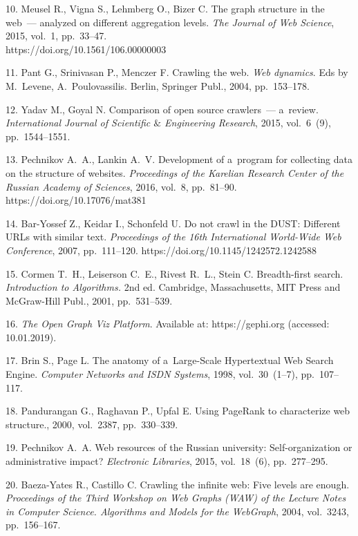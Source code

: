 {10. Meusel R., Vigna S., Lehmberg O., Bizer C. The graph structure
in the web~--- analy\-zed on different aggregation levels.
\emph{The Journal of Web Science}, 2015, vol.~1, pp.~33--47.\\
https://doi.org/10.1561/106.00000003

11. Pant G., Srinivasan P., Menczer F. Crawling the web. {\it Web
dynamics}. Eds by M.~Levene, A.~Poulovassilis. Berlin, Springer
Publ., 2004, pp.~153--178.

12. Yadav M., Goyal N. Comparison of open source crawlers~---
a~review. \emph{International Journal of Scientific $\&$
Engineering Research}, 2015, vol.~6~(9), pp.~1544--1551.

13. Pechnikov A.~A., Lankin A.~V. Development of a~program for
collecting data on the structure of websites. \emph{Proceedings of
the Karelian Research Center of the Russian Academy of Sciences},
2016, vol.~8, pp.~81--90. https://doi.org/10.17076/mat381

14. Bar-Yossef Z., Keidar I., Schonfeld U. Do not crawl in the
DUST: Different URLs with similar text. \emph{Proceedings of the
16th International World-Wide Web Conference}, 2007, pp.~111--120.
https://doi.org/10.1145/1242572.1242588

15. Cormen T.~H., Leiserson C.~E., Rivest R.~L., Stein C.
Breadth-first search. \emph{Introduc\-tion to Algorithms.} 2nd ed.
Cambridge, Massachusetts, MIT Press and McGraw-Hill Publ., 2001,
pp.~531--539.

16. {\it The Open Graph Viz Platform}. Available at:
https://gephi.org (accessed: 10.01.2019).

17. Brin S., Page L. The anatomy of a~Large-Scale Hypertextual Web
Search Engine. \emph{Computer Networks and ISDN Systems}, 1998,
vol.~30~(1--7), pp.~107--117.

18. Pandurangan G., Raghavan P., Upfal E. Using PageRank to
characterize web structure.\linebreak\newpage{}, 2000, vol.~2387, pp.~330--339.

19. Pechnikov A.~A. Web resources of the Russian university:
Self-organization or admini\-strative impact?
\emph{Electronic Libraries}, 2015, vol.~18~(6), pp.~277--295.

20. Baeza-Yates R., Castillo C. Crawling the infinite web: Five
levels are enough. {\it Procee\-dings of the Third Workshop on Web
Graphs (WAW) of the Lecture Notes in Computer Science. Algorithms
and Models for the WebGraph}, 2004, vol.~3243, pp.~156--167.

}
